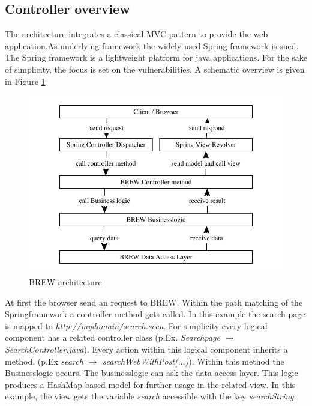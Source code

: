 \documentclass{llncs}%
\begin{document}
\subsection{Controller overview}\label{subsec:controller}
The architecture integrates a classical MVC pattern to provide the web application.As underlying framework the widely used Spring framework is sued. The Spring framework is a lightweight platform for java applications. For the sake of simplicity, the focus is set on the vulnerabilities. A schematic overview is given in Figure \ref{fig:architecture}

\begin{figure}
\centering
\includegraphics[width=1\textwidth]{architecture_fin}
\caption{BREW architecture} 
\label{fig:architecture}
\end{figure}

At first the browser send an request to BREW. Within the path matching of the Springframework a controller method gets called. In this example the search page is mapped to {\em http://mydomain/search.secu}. For simplicity every logical component has a related controller class (p.Ex. {\em Searchpage $\rightarrow$ SearchController.java}). Every action within this logical component inherits a method. (p.Ex {\em search $\rightarrow$ searchWebWithPost($\dots$)}).
Within this method the Businesslogic occurs. The businesslogic can ask the data access layer. This logic produces a HashMap-based model for further usage in the related view. In this example, the view gets the variable {\em search} accessible with the key {\em searchString}.
\end{document}
